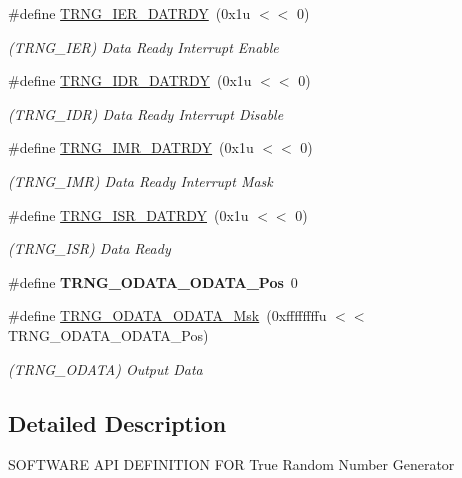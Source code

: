 \begin{DoxyCompactItemize}
\mbox{\label{group__SAME70__TRNG_gafa7553fafb1e7444a80b7e47618ac7c6}} 
\#define \mbox{\hyperlink{group__SAME70__TRNG_gafa7553fafb1e7444a80b7e47618ac7c6}{T\+R\+N\+G\+\_\+\+I\+E\+R\+\_\+\+D\+A\+T\+R\+DY}}~(0x1u $<$$<$ 0)
\begin{DoxyCompactList}\small\item\em (T\+R\+N\+G\+\_\+\+I\+ER) Data Ready Interrupt Enable \end{DoxyCompactList}\item 
\mbox{\label{group__SAME70__TRNG_ga2eca36f87c24da433fc1023980bdec96}} 
\#define \mbox{\hyperlink{group__SAME70__TRNG_ga2eca36f87c24da433fc1023980bdec96}{T\+R\+N\+G\+\_\+\+I\+D\+R\+\_\+\+D\+A\+T\+R\+DY}}~(0x1u $<$$<$ 0)
\begin{DoxyCompactList}\small\item\em (T\+R\+N\+G\+\_\+\+I\+DR) Data Ready Interrupt Disable \end{DoxyCompactList}\item 
\mbox{\label{group__SAME70__TRNG_ga85fa478ab4fd7c5abe0424fea333de82}} 
\#define \mbox{\hyperlink{group__SAME70__TRNG_ga85fa478ab4fd7c5abe0424fea333de82}{T\+R\+N\+G\+\_\+\+I\+M\+R\+\_\+\+D\+A\+T\+R\+DY}}~(0x1u $<$$<$ 0)
\begin{DoxyCompactList}\small\item\em (T\+R\+N\+G\+\_\+\+I\+MR) Data Ready Interrupt Mask \end{DoxyCompactList}\item 
\mbox{\label{group__SAME70__TRNG_ga1a78d13cc2eeeb76c61f130f75410de9}} 
\#define \mbox{\hyperlink{group__SAME70__TRNG_ga1a78d13cc2eeeb76c61f130f75410de9}{T\+R\+N\+G\+\_\+\+I\+S\+R\+\_\+\+D\+A\+T\+R\+DY}}~(0x1u $<$$<$ 0)
\begin{DoxyCompactList}\small\item\em (T\+R\+N\+G\+\_\+\+I\+SR) Data Ready \end{DoxyCompactList}\item 
\mbox{\label{group__SAME70__TRNG_gac9f3e26a110e4b2ce4a94dd6cff44e6f}} 
\#define {\bfseries T\+R\+N\+G\+\_\+\+O\+D\+A\+T\+A\+\_\+\+O\+D\+A\+T\+A\+\_\+\+Pos}~0
\item 
\mbox{\label{group__SAME70__TRNG_ga29f339c544af097a0d2552bda327d4a5}} 
\#define \mbox{\hyperlink{group__SAME70__TRNG_ga29f339c544af097a0d2552bda327d4a5}{T\+R\+N\+G\+\_\+\+O\+D\+A\+T\+A\+\_\+\+O\+D\+A\+T\+A\+\_\+\+Msk}}~(0xffffffffu $<$$<$ T\+R\+N\+G\+\_\+\+O\+D\+A\+T\+A\+\_\+\+O\+D\+A\+T\+A\+\_\+\+Pos)
\begin{DoxyCompactList}\small\item\em (T\+R\+N\+G\+\_\+\+O\+D\+A\+TA) Output Data \end{DoxyCompactList}\end{DoxyCompactItemize}


\subsection{Detailed Description}
S\+O\+F\+T\+W\+A\+RE A\+PI D\+E\+F\+I\+N\+I\+T\+I\+ON F\+OR True Random Number Generator 
